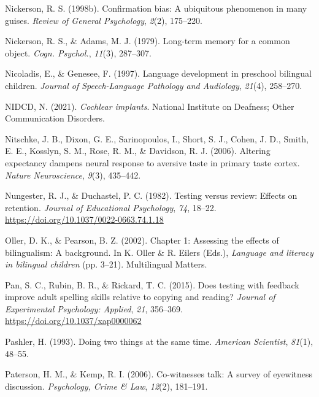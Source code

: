 \documentclass[
]{krantz}
\newlength{\cslhangindent}
\newlength{\cslentryspacingunit} %
\newenvironment{CSLReferences}[2] %
 {%
  \setlength{\parindent}{0pt}
  \ifodd #1
  \let\oldpar\par
  \def\par{\hangindent=\cslhangindent\oldpar}
  \fi
  \setlength{\parskip}{#2\cslentryspacingunit}
 }%
 {}
\begin{document}
\begin{CSLReferences}{1}{0}
\leavevmode{}%
Nickerson, R. S. (1998b). Confirmation bias: A ubiquitous phenomenon in many guises. \emph{Review of General Psychology}, \emph{2}(2), 175--220.

\leavevmode{}%
Nickerson, R. S., \& Adams, M. J. (1979). Long-term memory for a common object. \emph{Cogn. Psychol.}, \emph{11}(3), 287--307.

\leavevmode{}%
Nicoladis, E., \& Genesee, F. (1997). Language development in preschool bilingual children. \emph{Journal of Speech-Language Pathology and Audiology}, \emph{21}(4), 258--270.

\leavevmode{}%
NIDCD, N. (2021). \emph{Cochlear implants}. National Institute on Deafness; Other Communication Disorders.

\leavevmode{}%
Nitschke, J. B., Dixon, G. E., Sarinopoulos, I., Short, S. J., Cohen, J. D., Smith, E. E., Kosslyn, S. M., Rose, R. M., \& Davidson, R. J. (2006). Altering expectancy dampens neural response to aversive taste in primary taste cortex. \emph{Nature Neuroscience}, \emph{9}(3), 435--442.

\leavevmode{}%
Nungester, R. J., \& Duchastel, P. C. (1982). Testing versus review: Effects on retention. \emph{Journal of Educational Psychology}, \emph{74}, 18--22. \url{https://doi.org/10.1037/0022-0663.74.1.18}

\leavevmode{}%
Oller, D. K., \& Pearson, B. Z. (2002). Chapter 1: Assessing the effects of bilingualism: A background. In K. Oller \& R. Eilers (Eds.), \emph{Language and literacy in bilingual children} (pp. 3--21). Multilingual Matters.

\leavevmode{}%
Pan, S. C., Rubin, B. R., \& Rickard, T. C. (2015). Does testing with feedback improve adult spelling skills relative to copying and reading? \emph{Journal of Experimental Psychology: Applied}, \emph{21}, 356--369. \url{https://doi.org/10.1037/xap0000062}

\leavevmode{}%
Pashler, H. (1993). Doing two things at the same time. \emph{American Scientist}, \emph{81}(1), 48--55.

\leavevmode{}%
Paterson, H. M., \& Kemp, R. I. (2006). Co-witnesses talk: A survey of eyewitness discussion. \emph{Psychology, Crime \& Law}, \emph{12}(2), 181--191.


\end{CSLReferences}
\end{document}
